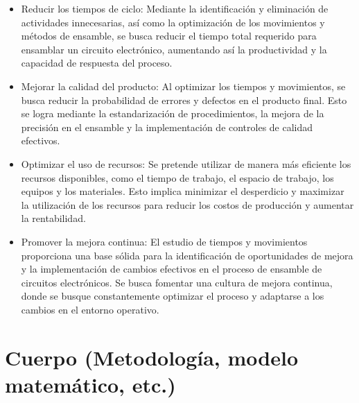         \begin{itemize}
            \item Reducir los tiempos de ciclo: Mediante la identificación y eliminación de actividades innecesarias, así como la optimización de los movimientos y métodos de ensamble, se busca reducir el tiempo total requerido para ensamblar un circuito electrónico, aumentando así la productividad y la capacidad de respuesta del proceso.
            \item Mejorar la calidad del producto: Al optimizar los tiempos y movimientos, se busca reducir la probabilidad de errores y defectos en el producto final. Esto se logra mediante la estandarización de procedimientos, la mejora de la precisión en el ensamble y la implementación de controles de calidad efectivos.
            \item Optimizar el uso de recursos: Se pretende utilizar de manera más eficiente los recursos disponibles, como el tiempo de trabajo, el espacio de trabajo, los equipos y los materiales. Esto implica minimizar el desperdicio y maximizar la utilización de los recursos para reducir los costos de producción y aumentar la rentabilidad.
            \item Promover la mejora continua: El estudio de tiempos y movimientos proporciona una base sólida para la identificación de oportunidades de mejora y la implementación de cambios efectivos en el proceso de ensamble de circuitos electrónicos. Se busca fomentar una cultura de mejora continua, donde se busque constantemente optimizar el proceso y adaptarse a los cambios en el entorno operativo. 
    
        \end{itemize}
    
        \section{Cuerpo (Metodología, modelo matemático, etc.)}
    
    
